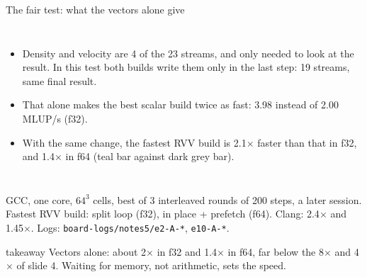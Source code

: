\documentclass[aspectratio=169,10pt,t]{beamer}
\newcommand{\sx}[1]{#1\ensuremath{\times}} %
\newcommand{\code}[1]{\texttt{#1}}
\newcommand{\takeaway}[1]{\par\vfill
  \begin{beamercolorbox}[wd=\textwidth,sep=4pt,rounded=true]{takeaway}
    \small #1
  \end{beamercolorbox}}
\begin{document}
\begin{frame}{The fair test: what the vectors alone give}
  \begin{columns}[T,onlytextwidth]
    \vspace{1mm}
    \centering
    \vspace{2mm}
    \begin{itemize}\small
      \item Density and velocity are 4 of the 23 streams, and only needed to look at the result. In this
            test both builds write them only in the last step: 19 streams, same final result.
      \item That alone makes the best scalar build twice as fast: 3.98 instead of 2.00\,MLUP/s (f32).
      \item With the same change, the fastest RVV build is \sx{2.1} faster than that in f32, and \sx{1.4}
            in f64 (teal bar against dark grey bar).
    \end{itemize}
  \end{columns}
  \vfill
  {\scriptsize\color{psgray}GCC, one core, $64^3$ cells, best of 3 interleaved rounds of 200 steps, a later
  session. Fastest RVV build: split loop (f32), in place + prefetch (f64). Clang: \sx{2.4} and \sx{1.45}.
  Logs: \code{board-logs/notes5/e2-A-*}, \code{e10-A-*}.\par}
  \takeaway{Vectors alone: about \sx{2} in f32 and \sx{1.4} in f64, far below the \sx{8} and \sx{4} of
    slide 4. Waiting for memory, not arithmetic, sets the speed.}
\end{frame}
\end{document}
